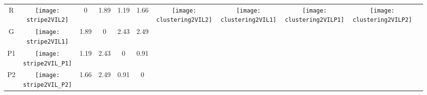 \documentclass[a4paper,11pt,twoside]{book}%
\begin{document}
\begin{appendices}
\begin{sidewaystable}[h!]
\begin{tabular*}{4cm}{cc|c|c|c|c|c|c|c|c|c|}
\cline{1-10}
\multicolumn{1}{|c|}{R} & \texttt{[image: stripe2VIL2]} & 0 & 1.89 & 1.19 & 1.66 & \multirow{4}{*}{\vspace{-0.3cm}\texttt{[image: clustering2VIL2]}} & \multirow{4}{*}{\vspace{-0.3cm}\texttt{[image: clustering2VIL1]}} & \multirow{4}{*}{\vspace{-0.3cm}\texttt{[image: clustering2VILP1]}} & \multirow{4}{*}{\vspace{-0.3cm}\texttt{[image: clustering2VILP2]}} &  \multirow{5}{*}{} \\
\cline{1-6}
\multicolumn{1}{|c|}{G} & \texttt{[image: stripe2VIL1]} & 1.89 & 0 & 2.43 & 2.49 & \multirow{4}{*}{} & \multirow{4}{*}{} & \multirow{4}{*}{} & \multirow{4}{*}{} & \multirow{5}{*}{} \\
\cline{1-6}
\multicolumn{1}{|c|}{P1} & \texttt{[image: stripe2VIL\_P1]} & 1.19 & 2.43 & 0 & 0.91 & \multirow{4}{*}{} & \multirow{4}{*}{} & \multirow{4}{*}{} & \multirow{4}{*}{} & \multirow{5}{*}{}  \\
\cline{1-6}
\multicolumn{1}{|c|}{P2} & \texttt{[image: stripe2VIL\_P2]} & 1.66 & 2.49 & 0.91 & 0 & \multirow{4}{*}{} & \multirow{4}{*}{} & \multirow{4}{*}{} & \multirow{4}{*}{} & \multirow{5}{*}{}  \\
\cline{1-11}
\end{tabular*}
\normalfont
\end{sidewaystable}




\end{appendices}
\end{document}
